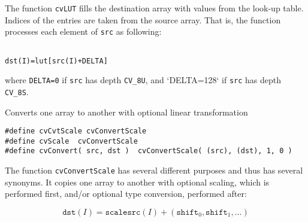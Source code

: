 \begin{description}
\end{description}

The function \texttt{cvLUT} fills the destination array with values from the look-up table. Indices of the entries are taken from the source array. That is, the function processes each element of \texttt{src} as following:

\begin{lstlisting}

dst(I)=lut[src(I)+DELTA]

\end{lstlisting}

where \texttt{DELTA=0} if \texttt{src} has depth \texttt{CV\_8U}, and `DELTA=128` if \texttt{src} has depth \texttt{CV\_8S}.


Converts one array to another with optional linear transformation


\begin{lstlisting}
#define cvCvtScale cvConvertScale
#define cvScale  cvConvertScale
#define cvConvert( src, dst )  cvConvertScale( (src), (dst), 1, 0 )
\end{lstlisting}

\begin{description}
\end{description}


The function \texttt{cvConvertScale} has several different purposes and thus has several synonyms. It copies one array to another with optional scaling, which is performed first, and/or optional type conversion, performed after:

\[
\texttt{dst}(I) = \texttt{scale} \texttt{src}(I) + (\texttt{shift}_0,\texttt{shift}_1,...)
\]

